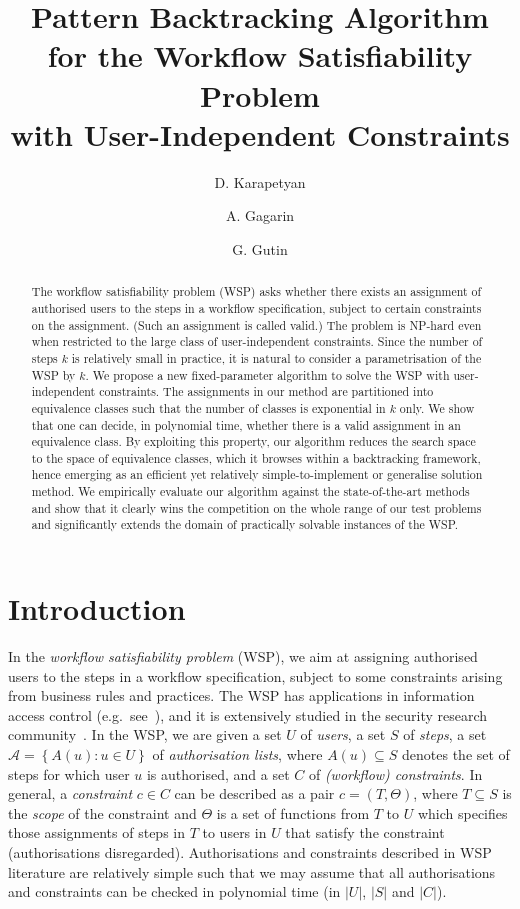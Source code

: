 \documentclass[runningheads,proof]{llncs}
\title{Pattern Backtracking Algorithm\\
for the Workflow Satisfiability Problem\\
with User-Independent Constraints}
\author{
D. Karapetyan\inst{1}
\and A. Gagarin\inst{2}
\and G. Gutin\inst{2}
}
\institute{
University of Nottingham, UK\\ 
\email{Daniel.Karapetyan@gmail.com}\\
           \and
Royal Holloway, University of London, UK \email{\{Andrei.Gagarin,G.Gutin\}@rhul.ac.uk}\\
           }
\newcommand{\set}[1]{\left\{#1\right\}}
\begin{document}
\maketitle
\begin{abstract}
The workflow satisfiability problem (WSP) asks whether there exists an assignment of authorised users to the steps in a workflow specification, subject to certain constraints on the assignment.
(Such an assignment is called valid.)
The problem is NP-hard even when restricted to the large class of user-independent constraints.
Since the number of steps $k$ is relatively small in practice, it is natural to consider a parametrisation of the WSP by $k$.
We propose a new fixed-parameter algorithm to solve the WSP with user-independent constraints.
The assignments in our method are partitioned into equivalence classes such that the number of classes is exponential in $k$ only.
We show that one can decide, in polynomial time, whether there is a valid assignment in an equivalence class.
By exploiting this property, our algorithm reduces the search space to the space of equivalence classes, which it browses within a backtracking framework, hence emerging as an efficient yet relatively simple-to-implement or generalise solution method.
We empirically evaluate our algorithm against the state-of-the-art methods and show that it clearly wins the competition on the whole range of our test problems and significantly extends the domain of practically solvable instances of the WSP.
\end{abstract}

\section{Introduction}\label{sec:intro}
In the \emph{workflow satisfiability problem} (WSP), we aim at assigning authorised users to the steps in a workflow specification, subject to some constraints arising from business rules and practices.
The WSP has applications in information access control (e.g.\ see~\cite{ANSI04,BaBuKa14,BeFeAt99}), and it is extensively studied in the security research community~\cite{BaBuKa14,BeFeAt99,Cr05,WaLi10}.  
In the WSP, we are given a set $U$ of \emph{users}, a set $S$ of \emph{steps}, a set $\mathcal{A} = \set{A(u) : u \in U}$ of \emph{authorisation lists}, where $A(u) \subseteq S$ denotes the set of steps for which user $u$ is authorised, and a set $C$ of \emph{(workflow) constraints}.
In general, a \emph{constraint} $c \in C$ can be described as a pair $c = (T, \Theta)$, where $T \subseteq S$ is the \emph{scope} of the constraint and $\Theta$ is a set of functions from $T$ to $U$ which specifies those assignments of steps in $T$ to users in $U$ that satisfy the constraint (authorisations disregarded).  Authorisations and constraints described in WSP literature are relatively simple such that we may assume that all authorisations and constraints can be checked in polynomial time (in $|U|$, $|S|$ and $|C|$).
\end{document}
